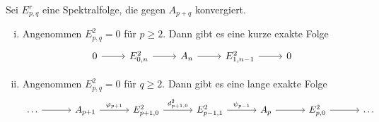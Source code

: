 \begin{lemma}[{name=[{exakte Folgen mit Moduln der $2$-Seite}]},label=lem:kes_konvergente_spektralfolge]
	Sei $E^r_{p,q}$ eine Spektralfolge, die gegen $A_{p+q}$ konvergiert. 
	\begin{enumerate}[(i),itemsep=0pt]
		\item Angenommen $E^2_{p,q}=0$ für $p\ge 2$.
		Dann gibt es eine kurze exakte Folge 
		\[
			\begin{tikzcd}
				0 \rar & E^2_{0,n} \rar & A_n \rar & E^2_{1,n-1} \rar & 0
			\end{tikzcd}
		\]
		\item Angenommen $E^2_{p,q}=0$ für $q \ge 2$. 
		Dann gibt es eine lange exakte Folge
		\[
			\begin{tikzcd}[sep=3.2em]
				\ldots \rar & A_{p+1} \rar["\varphi_{p+1}"] & E^2_{p+1,0} \rar["d^2_{p+1,0}"] & E^2_{p-1,1} \rar["\psi_{p-1}"] & A_p \rar & E^2_{p,0} \rar & \ldots 
			\end{tikzcd}
		\] 
	\end{enumerate}
\end{lemma}
